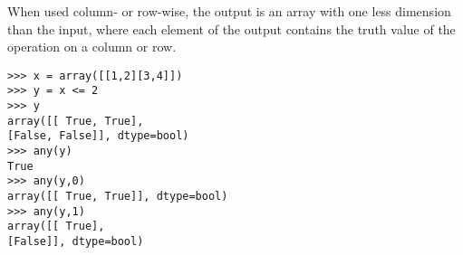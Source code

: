 \documentclass[11pt]{article} %
\begin{document}
When used column- or row-wise, the output is an array with one less dimension than the input, where each element
of the output contains the truth value of the operation on a column or row.
\begin{framed}
\begin{verbatim}
>>> x = array([[1,2][3,4]])
>>> y = x <= 2
>>> y
array([[ True, True],
[False, False]], dtype=bool)
>>> any(y)
True
>>> any(y,0)
array([[ True, True]], dtype=bool)
>>> any(y,1)
array([[ True],
[False]], dtype=bool)
\end{verbatim}
\end{framed}
\end{document}
